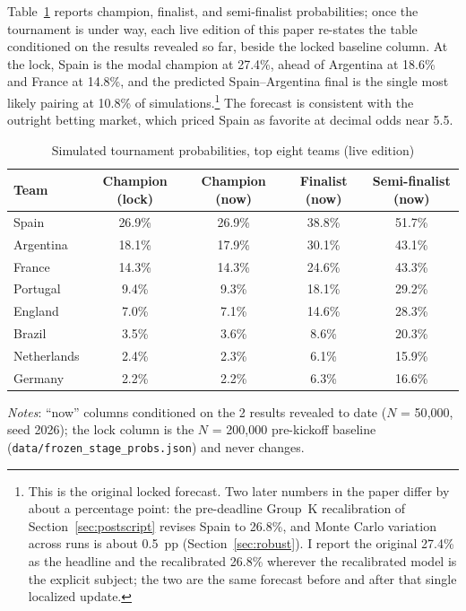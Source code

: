 \documentclass[11pt,letterpaper]{article}
\begin{document}
Table~\ref{tab:champ} reports champion, finalist, and semi-finalist probabilities; once the tournament is under way, each live edition of this paper re-states the table conditioned on the results revealed so far, beside the locked baseline column. At the lock, Spain is the modal champion at 27.4\%, ahead of Argentina at 18.6\% and France at 14.8\%, and the predicted Spain--Argentina final is the single most likely pairing at 10.8\% of simulations.\footnote{This is the original locked forecast. Two later numbers in the paper differ by about a percentage point: the pre-deadline Group~K recalibration of Section~\ref{sec:postscript} revises Spain to 26.8\%, and Monte Carlo variation across runs is about 0.5~pp (Section~\ref{sec:robust}). I report the original 27.4\% as the headline and the recalibrated 26.8\% wherever the recalibrated model is the explicit subject; the two are the same forecast before and after that single localized update.} The forecast is consistent with the outright betting market, which priced Spain as favorite at decimal odds near 5.5.

\begin{table}[!t]
  \centering
  \caption{Simulated tournament probabilities, top eight teams (live edition)}\label{tab:champ}
  \begin{footnotesize}
  \begin{threeparttable}
    {\begin{tabular*}{\textwidth}{@{\extracolsep{\fill}} lcccc}
      \toprule
      Team & Champion (lock) & Champion (now) & Finalist (now) & Semi-finalist (now) \\
      \midrule
      Spain          & 26.9\% & 26.9\% & 38.8\% & 51.7\% \\
      Argentina      & 18.1\% & 17.9\% & 30.1\% & 43.1\% \\
      France         & 14.3\% & 14.3\% & 24.6\% & 43.3\% \\
      Portugal       & 9.4\% & 9.3\% & 18.1\% & 29.2\% \\
      England        & 7.0\% & 7.1\% & 14.6\% & 28.3\% \\
      Brazil         & 3.5\% & 3.6\% & 8.6\% & 20.3\% \\
      Netherlands    & 2.4\% & 2.3\% & 6.1\% & 15.9\% \\
      Germany        & 2.2\% & 2.2\% & 6.3\% & 16.6\% \\
      \bottomrule
    \end{tabular*}}
    \begin{tablenotes}\notesize
      \item \textit{Notes}: ``now'' columns conditioned on the 2 results revealed to date ($N$ = 50{,}000, seed 2026); the lock column is the $N$ = 200{,}000 pre-kickoff baseline (\texttt{data/frozen\_stage\_probs.json}) and never changes.
    \end{tablenotes}
  \end{threeparttable}
  \end{footnotesize}
\end{table}
\end{document}

